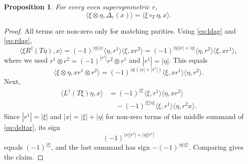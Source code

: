 \documentclass[11pt]{article}
\newtheorem{proposition}[theorem]{Proposition}
\theoremstyle{definition}
\newcommand{\lr}[1]{\langle #1\rangle}
\begin{document}
\begin{proposition}\label{prop:dualdelta}
For every even supersymmetric $r$,
\[
\lr{\xi\otimes\eta,\Delta_r(x)}=\lr{\xi\circ_T\eta,x}.
\]
\end{proposition}
\begin{proof}
All terms are non-zero only for matching parities. Using \eqref{eq:ldag} and \eqref{eq:rdag},
\[
\lr{\xi R^\dagger(T\eta),x}
=(-1)^{|\eta||x|}\lr{\eta,r^1}\lr{\xi,xr^2}
=(-1)^{|\eta||x|+|\eta|}\lr{\eta,r^2}\lr{\xi,xr^1},
\]
where we used $r^1\otimes r^2=(-1)^{|r^1|}r^2\otimes r^1$ and $|r^1|=|\eta|$. This equals
\[
\lr{\xi\otimes\eta,xr^1\otimes r^2}
=(-1)^{|\eta|(|x|+|r^1|)}\lr{\xi,xr^1}\lr{\eta,r^2}.
\]
Next,
\[
\begin{aligned}
\lr{L^\dagger(T\xi)\eta,x}
&=(-1)^{|\xi|}\lr{\xi,r^1}\lr{\eta,xr^2}\\
&\quad-(-1)^{|\xi||\eta|}\lr{\xi,r^1}\lr{\eta,r^2x}.
\end{aligned}
\]
Since $|r^1|=|\xi|$ and $|x|=|\xi|+|\eta|$ for non-zero terms of the middle summand of \eqref{eq:deltar}, its sign
\[
(-1)^{|x||r^1|+|\eta||r^1|}
\]
equals $(-1)^{|\xi|}$, and the last summand has sign $-(-1)^{|\eta||\xi|}$. Comparing gives the claim.
\end{proof}
\end{document}
